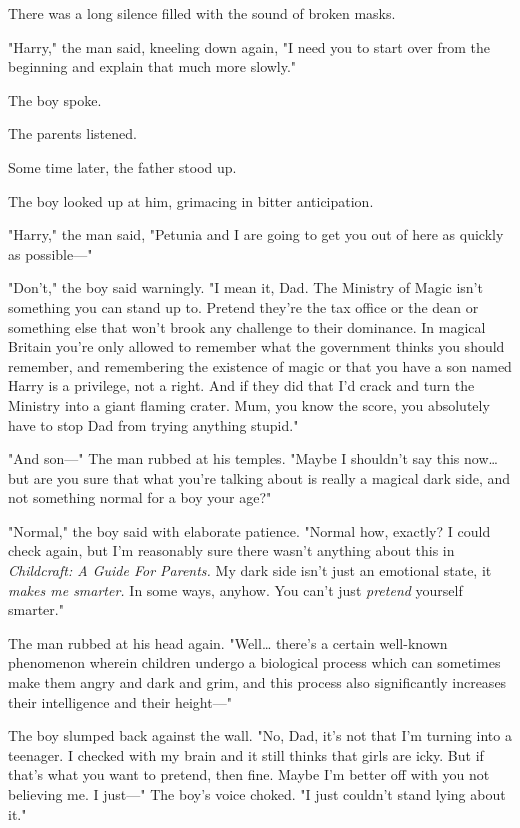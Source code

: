There was a long silence filled with the sound of broken masks.

"Harry," the man said, kneeling down again, "I need you to start over from the 
beginning and explain that much more slowly."

The boy spoke.

The parents listened.

Some time later, the father stood up.

The boy looked up at him, grimacing in bitter anticipation.

"Harry," the man said, "Petunia and I are going to get you out of here as 
quickly as possible---"

"Don't," the boy said warningly. "I mean it, Dad. The Ministry of Magic isn't 
something you can stand up to. Pretend they're the tax office or the dean or 
something else that won't brook any challenge to their dominance. In magical 
Britain you're only allowed to remember what the government thinks you should 
remember, and remembering the existence of magic or that you have a son named 
Harry is a privilege, not a right. And if they did that I'd crack and turn the 
Ministry into a giant flaming crater. Mum, you know the score, you absolutely 
have to stop Dad from trying anything stupid."

"And son---" The man rubbed at his temples. "Maybe I shouldn't say this 
now{\ldots} but are you sure that what you're talking about is really a magical 
dark side, and not something normal for a boy your age?"

"Normal," the boy said with elaborate patience. "Normal how, exactly? I could 
check again, but I'm reasonably sure there wasn't anything about this in 
\emph{Childcraft: A Guide For Parents.} My dark side isn't just an emotional 
state, it \emph{makes me smarter.} In some ways, anyhow. You can't just 
\emph{pretend} yourself smarter."

The man rubbed at his head again. "Well{\ldots} there's a certain well-known 
phenomenon wherein children undergo a biological process which can sometimes 
make them angry and dark and grim, and this process also significantly 
increases their intelligence and their height---"

The boy slumped back against the wall. "No, Dad, it's not that I'm turning into 
a teenager. I checked with my brain and it still thinks that girls are icky. 
But if that's what you want to pretend, then fine. Maybe I'm better off with 
you not believing me. I just---" The boy's voice choked. "I just couldn't stand 
lying about it."

